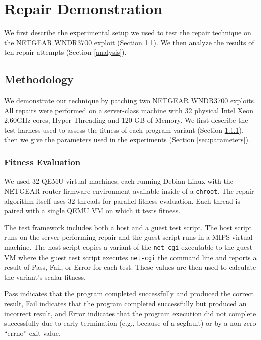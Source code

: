\documentclass{sigcomm-alternate}
\begin{document}
\section{Repair Demonstration}
\label{repair-demonstration}

We first describe the experimental setup we used to test the
repair technique on the NETGEAR WNDR3700 exploit (Section
\ref{methodology}).  We then analyze the results of ten repair
attempts (Section \ref{analysis}).

\subsection{Methodology}
\label{methodology}
We demonstrate our technique by patching two NETGEAR WNDR3700
exploits.  All repairs were performed on a server-class machine with
32 physical Intel Xeon 2.60GHz cores, Hyper-Threading and 120 GB of
Memory.  We first describe the test harness used to assess the fitness
of each program variant (Section
\ref{fitness-evaluation}), then we give the parameters used in the experiments
(Section \ref{sec:parameters}).

\subsubsection{Fitness Evaluation}
\label{fitness-evaluation}
We used 32 QEMU virtual machines, each
running Debian Linux with the NETGEAR router firmware environment
available inside of a \texttt{chroot}.  The repair algorithm itself
uses 32 threads for parallel fitness evaluation.  Each thread is
paired with a single QEMU VM on which it tests fitness.

The test framework includes both a host and a guest test script.  The
host script runs on the server performing repair and the guest script
runs in a MIPS virtual machine.  The host script copies a
variant of the \texttt{net-cgi} executable to the guest VM where the
guest test script executes \texttt{net-cgi} the command line and
reports a result of {\sc Pass}, {\sc Fail}, or {\sc Error} for each
test.  These values are then used to calculate the variant's scalar
fitness.

{\sc Pass} indicates that the program completed successfully and
produced the correct result, {\sc Fail} indicates that the program
completed successfully but produced an incorrect result, and {\sc
  Error} indicates that the program execution did not complete
successfully due to early termination (e.g., because of a segfault) or
by a non-zero ``errno'' exit value.
\end{document}
